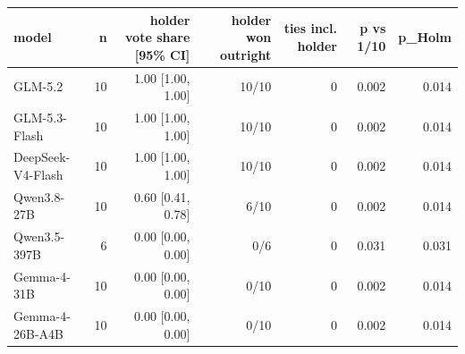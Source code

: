 \begin{tabular}{lrrrrrr}
\toprule
\textbf{model} & \textbf{n} & \textbf{holder vote share [95\% CI]} & \textbf{holder won outright} & \textbf{ties incl. holder} & \textbf{p vs 1/10} & \textbf{p\_Holm} \\
\midrule
GLM-5.2 & 10 & 1.00 [1.00, 1.00] & 10/10 & 0 & 0.002 & 0.014 \\
GLM-5.3-Flash & 10 & 1.00 [1.00, 1.00] & 10/10 & 0 & 0.002 & 0.014 \\
DeepSeek-V4-Flash & 10 & 1.00 [1.00, 1.00] & 10/10 & 0 & 0.002 & 0.014 \\
Qwen3.8-27B & 10 & 0.60 [0.41, 0.78] & 6/10 & 0 & 0.002 & 0.014 \\
Qwen3.5-397B & 6 & 0.00 [0.00, 0.00] & 0/6 & 0 & 0.031 & 0.031 \\
Gemma-4-31B & 10 & 0.00 [0.00, 0.00] & 0/10 & 0 & 0.002 & 0.014 \\
Gemma-4-26B-A4B & 10 & 0.00 [0.00, 0.00] & 0/10 & 0 & 0.002 & 0.014 \\
\bottomrule
\end{tabular}
